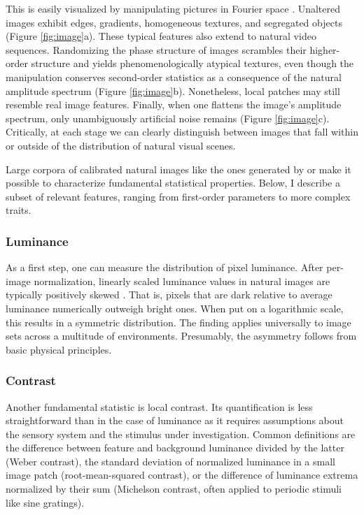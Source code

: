 This is easily visualized by manipulating pictures in Fourier space \citep{Hyvarinen:2009hf}. Unaltered images exhibit edges, gradients, homogeneous textures, and segregated objects (Figure \ref{fig:image}a). These typical features also extend to natural video sequences. Randomizing the phase structure of images scrambles their higher-order structure and yields phenomenologically atypical textures, even though the manipulation conserves second-order statistics as a consequence of the natural amplitude spectrum (Figure \ref{fig:image}b). Nonetheless, local patches may still resemble real image features. Finally, when one flattens the image's amplitude spectrum, only unambiguously artificial noise remains (Figure \ref{fig:image}c). Critically, at each stage we can clearly distinguish between images that fall within or outside of the distribution of natural visual scenes.

Large corpora of calibrated natural images like the ones generated by \citet{vanHateren:1998jt} or \citet{Tkacik:2011aa} make it possible to characterize fundamental statistical properties. Below, I describe a subset of relevant features, ranging from first-order parameters to more complex traits.

\subsubsection{Luminance}

As a first step, one can measure the distribution of pixel luminance. After per-image normalization, linearly scaled luminance values in natural images are typically positively skewed \citep{Laughlin:1981wn,Brady:2000aa,Geisler:2008gu}. That is, pixels that are dark relative to average luminance numerically outweigh bright ones. When put on a logarithmic scale, this results in a symmetric distribution. The finding applies universally to image sets across a multitude of environments. Presumably, the asymmetry follows from basic physical principles.

\subsubsection{Contrast}
Another fundamental statistic is local contrast. Its quantification is less straightforward than in the case of luminance as it requires assumptions about the sensory system and the stimulus under investigation. Common definitions are the difference between feature and background luminance divided by the latter (Weber contrast), the standard deviation of normalized luminance in a small image patch (root-mean-squared contrast), or the difference of luminance extrema normalized by their sum (Michelson contrast, often applied to periodic stimuli like sine gratings).

